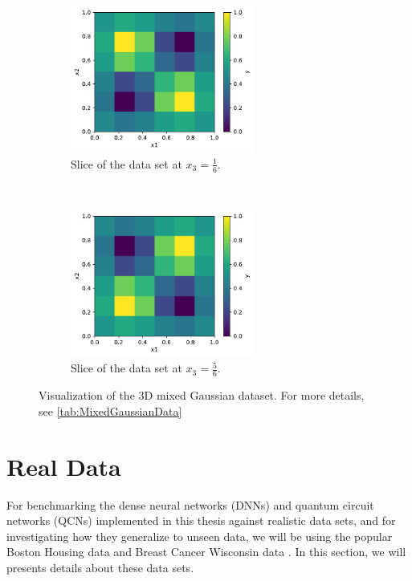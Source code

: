 \begin{figure}[H]
    \centering
    \begin{subfigure}[t]{0.5\textwidth}
        \centering
        \includegraphics[height=1.9in]{latex/figures/gaussian_3D_1.pdf}
        \caption{Slice of the data set at $x_3 = \frac{1}{6}$.}
        
    \end{subfigure}%
    ~ 
    \begin{subfigure}[t]{0.5\textwidth}
        \centering
        \includegraphics[height=1.9in]{latex/figures/gaussian_3D_2.pdf}
        \caption{Slice of the data set at $x_3 = \frac{5}{6}$.}
    \end{subfigure}
    \caption{Visualization of the 3D mixed Gaussian dataset. For more details, see \cref{tab:MixedGaussianData}}
    \label{fig:mixed Gaussian 3D}
\end{figure}





\section{Real Data}\label{sec:Real Data stuff}
For benchmarking the dense neural networks (DNNs) and quantum circuit networks (QCNs) implemented in this thesis against realistic data sets, and for investigating how they generalize to unseen data, we will be using the popular Boston Housing data \cite{boston} and Breast Cancer Wisconsin data \cite{cancer}. In this section, we will presents details about these data sets. 

